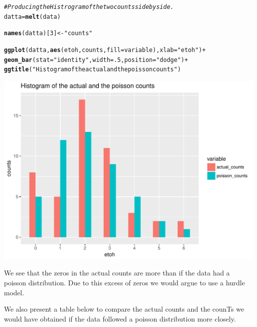 \documentclass{article}\usepackage[]{graphicx}\usepackage[]{color}
\makeatletter
\def\maxwidth{ %
  \ifdim\Gin@nat@width>\linewidth
    \linewidth
  \else
    \Gin@nat@width
  \fi
}
\newcommand{\hlnum}[1]{\textcolor[rgb]{0.686,0.059,0.569}{#1}}%
\newcommand{\hlstr}[1]{\textcolor[rgb]{0.192,0.494,0.8}{#1}}%
\newcommand{\hlcom}[1]{\textcolor[rgb]{0.678,0.584,0.686}{\textit{#1}}}%
\newcommand{\hlopt}[1]{\textcolor[rgb]{0,0,0}{#1}}%
\newcommand{\hlstd}[1]{\textcolor[rgb]{0.345,0.345,0.345}{#1}}%
\newcommand{\hlkwb}[1]{\textcolor[rgb]{0.69,0.353,0.396}{#1}}%
\newcommand{\hlkwc}[1]{\textcolor[rgb]{0.333,0.667,0.333}{#1}}%
\newcommand{\hlkwd}[1]{\textcolor[rgb]{0.737,0.353,0.396}{\textbf{#1}}}%
\newenvironment{kframe}{%
 \def\at@end@of@kframe{}%
 \ifinner\ifhmode%
  \def\at@end@of@kframe{\end{minipage}}%
  \begin{minipage}{\columnwidth}%
 \fi\fi%
 \def\FrameCommand##1{\hskip\@totalleftmargin \hskip-\fboxsep
 \colorbox{shadecolor}{##1}\hskip-\fboxsep
     \hskip-\linewidth \hskip-\@totalleftmargin \hskip\columnwidth}%
 \MakeFramed {\advance\hsize-\width
   \@totalleftmargin\z@ \linewidth\hsize
   \@setminipage}}%
 {\par\unskip\endMakeFramed%
 \at@end@of@kframe}
\newenvironment{knitrout}{}{} %
\makeatother
\begin{document}
\begin{knitrout}
\begin{kframe}
\begin{alltt}
\hlcom{# Producing the Histrogram of the two counts side by side. }
\hlstd{datta} \hlkwb{=} \hlkwd{melt}\hlstd{(data)}

\hlkwd{names}\hlstd{(datta)[}\hlnum{3}\hlstd{]} \hlkwb{<-} \hlstr{"counts"}

\hlkwd{ggplot}\hlstd{(datta,} \hlkwd{aes}\hlstd{(etoh,counts,} \hlkwc{fill} \hlstd{= variable),} \hlkwc{xlab}\hlstd{=}\hlstr{"etoh"}\hlstd{)} \hlopt{+}
\hlkwd{geom_bar}\hlstd{(}\hlkwc{stat}\hlstd{=}\hlstr{"identity"}\hlstd{,} \hlkwc{width}\hlstd{=}\hlnum{.5}\hlstd{,} \hlkwc{position} \hlstd{=} \hlstr{"dodge"}\hlstd{)}  \hlopt{+}
  \hlkwd{ggtitle}\hlstd{(}\hlstr{"Histogram of the actual and the poisson counts"}\hlstd{)}
\end{alltt}
\end{kframe}
\includegraphics[width=\maxwidth]{figure/unnamed-chunk-3-1} 

\end{knitrout}

We see that the zeros in the actual counts are more than if the data had a poisson distribution. Due to this excess of zeros we would argue to use a hurdle model. 

\vspace{5mm}

We also present a table below to compare the actual counts and the counTs we would have obtained if the data followed a poisson distribution more closely. 

\vspace{7mm}
\end{document}

